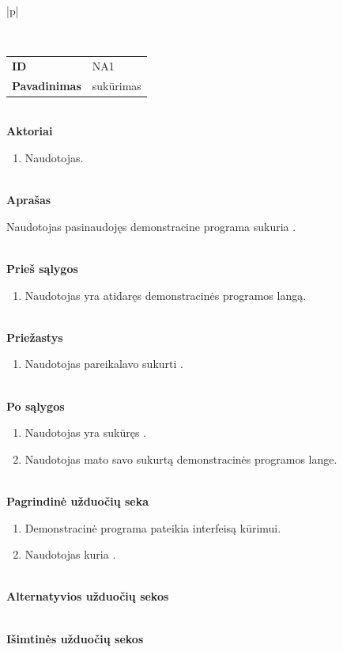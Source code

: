 \begin{center}
    \begin{longtable}{|p{\textwidth}|}
    \caption{\DVCM{} kūrimo naudojimo atvejis}
	\label{tab:program_re_dvcm_creation}
	\\ \hline
    \begin{tabular}{@{}p{3.5cm}p{12cm}}
    	\\
    	\textbf{ID} & NA1
    	\\
    	\textbf{Pavadinimas} & \DVCM{} sukūrimas
    	\\
    \end{tabular}
    \\
    \textbf{Aktoriai}
    \begin{enumerate}
    	\item Naudotojas.
	\end{enumerate}
    \\
    \textbf{Aprašas}

      Naudotojas pasinaudojęs demonstracine programa sukuria \DVCM{}.

    \\
    \textbf{Prieš sąlygos}
    \begin{enumerate}
    	\item Naudotojas yra atidaręs demonstracinės programos langą.
	\end{enumerate}
    \\
    \textbf{Priežastys}
    \begin{enumerate}
    	\item Naudotojas pareikalavo sukurti \DVCM{}.
	\end{enumerate}
    \\
    \textbf{Po sąlygos}
    \begin{enumerate}
    	\item Naudotojas yra sukūręs \DVCM{}.
      \item Naudotojas mato savo sukurtą \DVCM{} demonstracinės programos lange.
	\end{enumerate}
    \\
    \textbf{Pagrindinė užduočių seka}
    \begin{enumerate}
    	\item Demonstracinė programa pateikia interfeisą \DVCM{} kūrimui.
    	\item Naudotojas kuria \DVCM{}.
	\end{enumerate}
    \\
    \textbf{Alternatyvios užduočių sekos}

    \\
    \textbf{Išimtinės užduočių sekos}

    \\
    \\ \hline
    \end{longtable}
\end{center}

